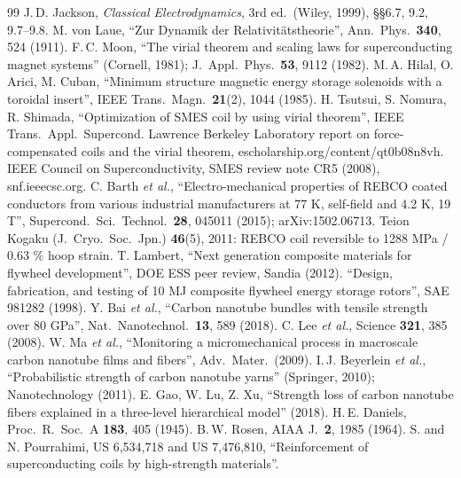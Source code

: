 \begin{thebibliography}{99}\small
{} J.\,D. Jackson, \emph{Classical Electrodynamics}, 3rd ed.\ (Wiley, 1999), \S\S6.7, 9.2, 9.7--9.8.
 M. von Laue, ``Zur Dynamik der Relativit\"atstheorie'', Ann.\ Phys.\ \textbf{340}, 524 (1911).
 F.\,C. Moon, ``The virial theorem and scaling laws for superconducting magnet systems'' (Cornell, 1981); J.\ Appl.\ Phys.\ \textbf{53}, 9112 (1982).
 M.\,A. Hilal, O. Arici, M. Cuban, ``Minimum structure magnetic energy storage solenoids with a toroidal insert'', IEEE Trans.\ Magn.\ \textbf{21}(2), 1044 (1985).
 H. Tsutsui, S. Nomura, R. Shimada, ``Optimization of SMES coil by using virial theorem'', IEEE Trans.\ Appl.\ Supercond.
 Lawrence Berkeley Laboratory report on force-compensated coils and the virial theorem, escholarship.org/content/qt0b08n8vh.
 IEEE Council on Superconductivity, SMES review note CR5 (2008), snf.ieeecsc.org.
 C. Barth \emph{et al.}, ``Electro-mechanical properties of REBCO coated conductors from various industrial manufacturers at 77 K, self-field and 4.2 K, 19 T'', Supercond.\ Sci.\ Technol.\ \textbf{28}, 045011 (2015); arXiv:1502.06713.
 Teion Kogaku (J.\ Cryo.\ Soc.\ Jpn.) \textbf{46}(5), 2011: REBCO coil reversible to 1288 MPa / 0.63 \% hoop strain.
 T. Lambert, ``Next generation composite materials for flywheel development'', DOE ESS peer review, Sandia (2012).
 ``Design, fabrication, and testing of 10 MJ composite flywheel energy storage rotors'', SAE 981282 (1998).
 Y. Bai \emph{et al.}, ``Carbon nanotube bundles with tensile strength over 80 GPa'', Nat.\ Nanotechnol.\ \textbf{13}, 589 (2018).
 C. Lee \emph{et al.}, Science \textbf{321}, 385 (2008).
 W. Ma \emph{et al.}, ``Monitoring a micromechanical process in macroscale carbon nanotube films and fibers'', Adv.\ Mater.\ (2009).
 I.\,J. Beyerlein \emph{et al.}, ``Probabilistic strength of carbon nanotube yarns'' (Springer, 2010); Nanotechnology (2011).
 E. Gao, W. Lu, Z. Xu, ``Strength loss of carbon nanotube fibers explained in a three-level hierarchical model'' (2018).
 H.\,E. Daniels, Proc.\ R.\ Soc.\ A \textbf{183}, 405 (1945).
 B.\,W. Rosen, AIAA J.\ \textbf{2}, 1985 (1964).
 S. and N. Pourrahimi, US 6,534,718 and US 7,476,810, ``Reinforcement of superconducting coils by high-strength materials''.

\end{thebibliography}
